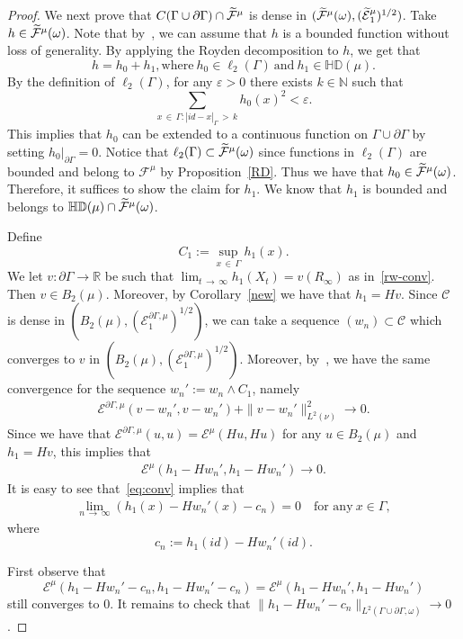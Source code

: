 \documentclass[AHL,Unicode,longabstracts,published]{cedram}
\newcommand{\ce}{\mathcal{E}}
\newcommand{\cf}{\mathcal{F}}
\newcommand{\cC}{\mathcal{C}}
\newcommand{\br}{\mathbb{R}}
\newcommand{\bn}{\mathbb{N}}
\newcommand{\bHD}{\mathbb{HD}}
\newcommand*{\MK}{\mkern 2mu}
\let\oldtilde\tilde
\renewcommand*{\tilde}[1]{\mathchoice{\widetilde{#1}}{\widetilde{#1}}{\oldtilde{#1}}{\oldtilde{#1}}}
\begin{document}
\begin{proof}
We next prove that $C(\Gamma\cup\partial\Gamma)\cap\tilde\cf^{\mu}$ is dense in $(\tilde\cf^{\mu}(\omega), (\tilde\ce^{\mu}_1)^{1/2})$. Take $h \in\tilde\cf^{\mu}(\omega)$. Note that by~\cite[Theorem~1.4.2$\MK$(i), (iii)]{FOT}, we can assume that $h$ is a bounded function without loss of generality. By applying the Royden decomposition to $h$, we get that
\[
h=h_0+h_1,\text{where}\ h_0\in\ell_2(\Gamma)\ \text{and}\ h_1\in\bHD(\mu).
\]
By the definition of $\ell_2(\Gamma)$, for any $\varepsilon>0$ there exists $k\in\bn$ such that
\[
\sum_{x\,\in\,\Gamma:|id-x|_{\Gamma}\,>\,k}h_0(x)^2<\varepsilon.
\]
This implies that $h_0$ can be extended to a continuous function on $\Gamma\cup\partial\Gamma$ by setting $h_0|_{\partial\Gamma}=0$. Notice that $\ell_2(\Gamma)\subset\tilde\cf^{\mu}(\omega)$ since functions in $\ell_2(\Gamma)$ are bounded and belong to $\cf^{\mu}$ by Proposition~\ref{RD}. Thus we have that $h_0\in\tilde\cf^{\mu}(\omega)$. Therefore, it suffices to show the claim for $h_1$. We know that $h_1$ is bounded and belongs to $\bHD(\mu)\cap\tilde\cf^{\mu}(\omega)$.

Define
\[
C_1:=\sup_{x\,\in\,\Gamma}h_1(x).
\]
We let $v:\partial\Gamma\rightarrow\br$ be such that $\lim_{t\,\to\,\infty}h_1(X_t)=v(R_\infty)$ as in~\eqref{rw-conv}. Then $v\in B_2(\mu)$. Moreover, by Corollary~\ref{new} we have that $h_1=Hv.$ Since $\cC$ is dense in $(B_2(\mu),(\ce^{\partial\Gamma,\mu}_1)^{1/2})$, we can take a sequence $(w_n)\subset\cC$ which converges to $v$ in $(B_2(\mu),(\ce^{\partial\Gamma,\mu}_1)^{1/2})$. Moreover, by~\cite[Theorem~1.4.2$\MK$(v)]{FOT}, we have the same convergence for the sequence $w_n':= w_n\wedge C_1$, namely
\begin{align}\label{e1to0}
\ce^{\partial\Gamma,\mu}\left(v-w_n',v-w_n'\right)+\|v-w_n'\|^2_{L^2(\nu)}\rightarrow0.
\end{align}
Since we have that $\ce^{\partial\Gamma,\mu}(u,u)=\ce^{\mu}(Hu,Hu)$ for any $u\in B_2(\mu)$ and $h_1=Hv$, this implies that
\begin{align}\label{eq:conv}
\ce^{\mu}\left(h_1-Hw_n',h_1-Hw_n'\right)\rightarrow0.
\end{align}
It is easy to see that~\eqref{eq:conv} implies that
\begin{align}\label{p-w-con}
\lim_{n\,\to\,\infty}\left(h_1(x)-Hw_n'(x)-c_n\right)=0\quad \text{for\ any}\ x\in\Gamma,
\end{align}
where
\[
c_n:=h_1(id)-Hw_n'(id).
\]

First observe that
\[
\ce^{\mu}\left(h_1-Hw_n'-c_n,h_1-Hw_n'-c_n\right)=\ce^{\mu}\left(h_1-Hw_n',h_1-Hw_n'\right)
\]
still converges to $0$.
It remains to check that $\|h_1-Hw_n'-c_n\|_{L^2(\Gamma\cup\partial\Gamma,\omega)}\rightarrow0$.


\end{proof}
\end{document}
